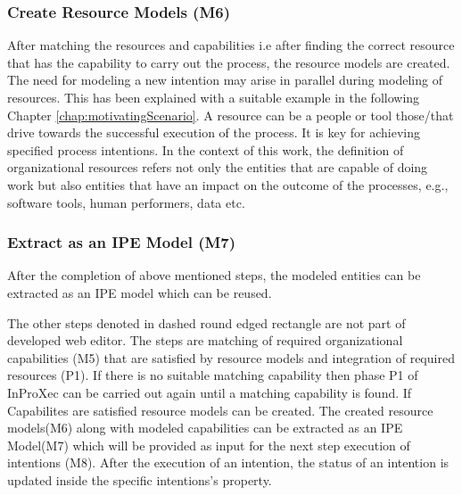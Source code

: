 \subsubsection{Create Resource Models (M6)}  
After matching the resources and capabilities i.e after finding the correct resource that has the capability to carry out the process, the resource models are created. The need for modeling a new intention may arise in parallel during modeling of resources. This has been explained with a suitable example in the following Chapter \ref{chap:motivatingScenario}.  A resource can be a people or tool those/that drive towards the successful execution of the process. It is key for achieving specified process intentions. In the context of this work, the definition of organizational resources refers not only the entities that are capable of doing work but also entities that have an impact on the outcome of the processes, e.g., software tools, human performers, data etc.      

\subsubsection{Extract as an IPE Model (M7)}  
After the completion of above mentioned steps, the modeled entities can be extracted as an IPE model which can be reused. 

The other steps denoted in dashed round edged rectangle are not part of developed web editor. The steps are matching of required organizational capabilities (M5) that are satisfied by resource models and integration of required resources (P1). If there is no suitable matching capability then phase P1 of InProXec can be carried out again until a matching capability is found. If Capabilites are satisfied resource models can be created. The created resource models(M6) along with modeled capabilities can be extracted as an IPE Model(M7) which will be provided as input for the next step execution of intentions (M8). After the execution of an intention, the status of an intention is updated inside the specific intentions's property. 

